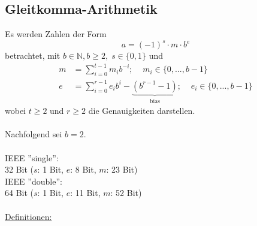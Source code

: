 \documentclass[a4paper,twocolumn,10pt]{article}
\begin{document}
\subsection{Gleitkomma-Arithmetik}
Es werden Zahlen der Form
\begin{equation*}
a=(-1)^s\cdot m\cdot b^e
\end{equation*}
betrachtet, mit $b\in\mathbb{N}, b\geq 2,\;s\in\{0,1\}$ und
\begin{equation*}
\begin{split}
m&=\sum_{i=0}^{t-1}m_ib^{-i};\;\;\;\;m_i\in\{0,...,b-1\}\\
e&=\sum_{i=0}^{r-1}e_ib^i-\underbrace{(b^{r-1}-1)}_{\text{bias}}; \;\;\;\;e_i\in\{0,...,b-1\}
\end{split}
\end{equation*}
wobei $t\geq 2$ und $r\geq 2$ die Genauigkeiten darstellen.\\\\
Nachfolgend sei $b=2$.\\\\
IEEE ''single'':\\
32 Bit ($s$: 1 Bit, $e$: 8 Bit, $m$: 23 Bit)\\
IEEE ''double'':\\
64 Bit ($s$: 1 Bit, $e$: 11 Bit, $m$: 52 Bit)\\\\
\underline{Definitionen:}
\end{document}
